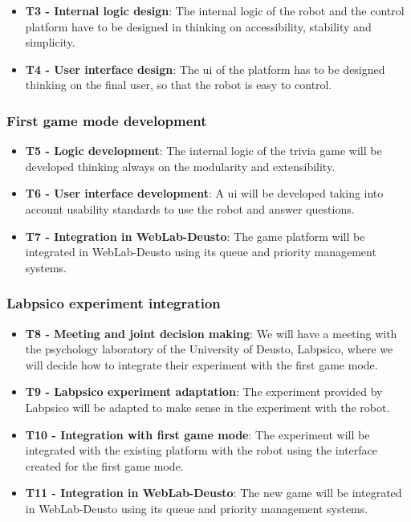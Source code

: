 \begin{itemize}
\item \textbf{T3 - Internal logic design}: The internal logic of the robot and the control platform
have to be designed in thinking on accessibility, stability and simplicity.

\item \textbf{T4 - User interface design}: The \acrlong{ui} of the platform has to be designed
thinking on the final user, so that the robot is easy to control.
\end{itemize}

\subsubsection{First game mode development}

\begin{itemize}
\item \textbf{T5 - Logic development}: The internal logic of the trivia game will be developed
thinking always on the modularity and extensibility.

\item \textbf{T6 - User interface development}: A \acrlong{ui} will be developed taking into account
usability standards to use the robot and answer questions.

\item \textbf{T7 - Integration in WebLab-Deusto}: The game platform will be integrated in
WebLab-Deusto using its queue and priority management systems.
\end{itemize}

\subsubsection{Labpsico experiment integration}

\begin{itemize}
\item \textbf{T8 - Meeting and joint decision making}: We will have a meeting with the psychology
laboratory of the University of Deusto, Labpsico, where we will decide how to integrate their
experiment with the first game mode.

\item \textbf{T9 - Labpsico experiment adaptation}: The experiment provided by Labpsico will be
adapted to make sense in the experiment with the robot.

\item \textbf{T10 - Integration with first game mode}: The experiment will be integrated with the
existing platform with the robot using the interface created for the first game mode.

\item \textbf{T11 - Integration in WebLab-Deusto}: The new game will be integrated in WebLab-Deusto
using its queue and priority management systems.
\end{itemize}


